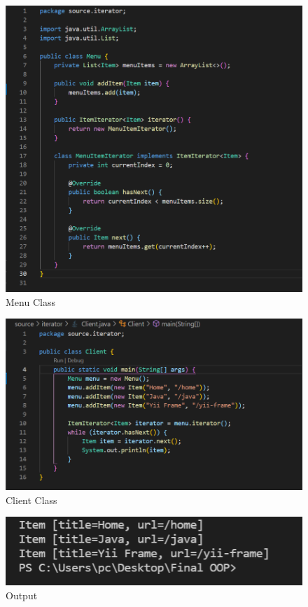 \begin{figure}[!htb]
    \centering
    \includegraphics[width=\textwidth]{fig/Iterator/menu_class.png}
    \caption{Menu Class}
    \label{fig:menu_class}
\end{figure}
\begin{figure}[!htb]
    \centering
    \includegraphics[width=\textwidth]{fig/Iterator/client_class.png}
    \caption{Client Class}
    \label{fig:client_class}
\end{figure}
\begin{figure}
    \centering
    \includegraphics[width=\textwidth]{fig/Iterator/iterator_output.png}
    \caption{Output}
    \label{fig:iterator_output}
\end{figure}

